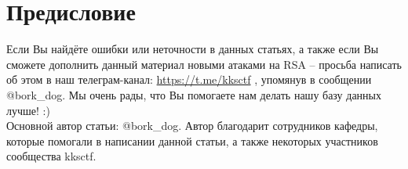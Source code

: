 \documentclass[12pt,a4paper]{scrartcl}
\begin{document}
\section{Предисловие}

Если Вы найдёте ошибки или неточности в данных статьях, а также если Вы сможете
дополнить данный материал новыми атаками на RSA – просьба написать об этом в наш
телеграм-канал: \href{https://t.me/kksctf}{https://t.me/kksctf} , упомянув в сообщении @bork\_dog. Мы очень
рады, что Вы помогаете нам делать нашу базу данных лучше! :)\\

Основной автор статьи: @bork\_dog. Автор благодарит сотрудников кафедры, которые помогали в написании данной статьи, а также некоторых участников сообщества kksctf.
\end{document}
